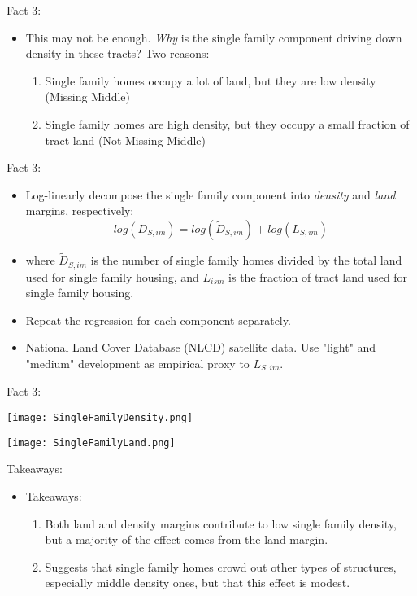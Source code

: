 \documentclass{beamer}
\theoremstyle{plain}
\begin{document}
\begin{frame}{Fact 3:}
\begin{itemize}
	\color{black}
	\item This may not be enough. \textit{Why} is the single family component driving down density in these tracts? Two reasons:
	\begin{enumerate}
		\itemsep1em
		\item  Single family homes occupy a lot of land, but they are low density (Missing Middle)
		\item Single family homes are high density, but they occupy a small fraction of tract land (Not Missing Middle)
	\end{enumerate}
\end{itemize}	
\end{frame}

\begin{frame}{Fact 3:}
\begin{itemize}
\color{black}
\item Log-linearly decompose the single family component into \textit{density} and \textit{land} margins, respectively: 
\begin{equation}
	log(D_{S, im}) = log(\tilde{D}_{S, im}) + log(L_{S, im})
\end{equation}
\item where $\tilde{D}_{S, im}$ is the number of single family homes divided by the total land used for single family housing, and $L_{ism}$ is the fraction of tract land used for single family housing. 
\item \color{red} Repeat the regression for each component separately. \color{black}
\item National Land Cover Database (NLCD) satellite data. Use "light" and "medium" development as empirical proxy to $L_{S, im}$. 
\end{itemize}
\end{frame}

\begin{frame}{Fact 3:}
	\centerline{	\texttt{[image: SingleFamilyDensity.png]}}
\centerline{	
	\texttt{[image: SingleFamilyLand.png]}}
\end{frame}

\begin{frame}{Takeaways:}
\begin{itemize}
	\color{black}
	\item Takeaways:
	\begin{enumerate}
		\item Both land and density margins contribute to low single family density, but a majority of the effect comes from the land margin. 
		\item Suggests that single family homes crowd out other types of structures, especially middle density ones, but that this effect is modest. 
	\end{enumerate}
\end{itemize}
\end{frame}
\end{document}
